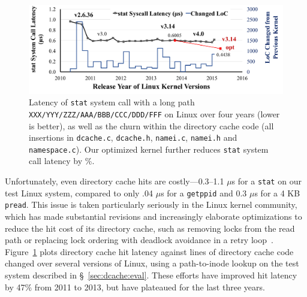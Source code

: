 \begin{figure}[t!]
\centering
\includegraphics[width=5.5in]{dcache/plots/latency-by-version.pdf}
\footnotesize
\caption[Lantecy of {\tt stat} system call over years.]
{Latency of {\tt stat} system call with a long path {\tt XXX/YYY/ZZZ/AAA/BBB/CCC/DDD/FFF} on Linux over four years (lower is better), as well as the churn within the directory cache code (all insertions in {\tt dcache.c}, {\tt dcache.h}, {\tt namei.c}, {\tt namei.h} and {\tt namespace.c}). 
Our optimized \linuxver{} kernel 
further reduces {\tt stat} system call latency by \statspeedup{}\%.}
\label{fig:dcache:by-version}
\end{figure}


Unfortunately, even directory cache hits are costly---0.3--1.1 $\mu$s for a {\tt stat} on our test Linux system, compared to only .04 $\mu$s for a {\tt getppid} and 0.3 $\mu$s for a 4 KB {\tt pread}. 
This issue is taken particularly seriously in the Linux kernel community, which has 
made substantial revisions and increasingly elaborate optimizations to reduce the hit cost
of its directory cache, such as removing locks from the read path or replacing lock ordering with deadlock avoidance in a retry loop~\citep{corbet09jls,dcache-rcu}.
Figure~\ref{fig:dcache:by-version} plots directory cache hit latency against  lines of directory cache code changed 
over several versions of Linux, using a path-to-inode lookup \microbench{} on the test system described
in \S~\ref{sec:dcache:eval}.
These efforts have improved hit latency by 47\% from 2011 to 2013, but have plateaued
for the last three years.

